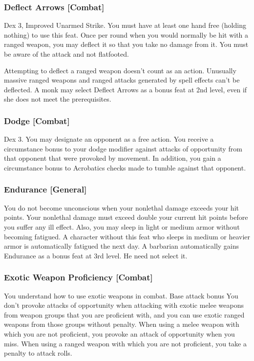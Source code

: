 \subsubsection{Deflect Arrows [Combat]}
 Dex 3, Improved Unarmed Strike.
 You must have at least one hand free (holding nothing) to use this feat. Once per round when you would normally be hit with a ranged weapon, you may deflect it so that you take no damage from it. You must be aware of the attack and not flatfooted.
\par Attempting to deflect a ranged weapon doesn't count as an action. Unusually massive ranged weapons and ranged attacks generated by spell effects can't be deflected.
 A monk may select Deflect Arrows as a bonus feat at 2nd level, even if she does not meet the prerequisites.

\subsubsection{Dodge [Combat]}
 Dex 3.
 You may designate an opponent as a free action. You receive a  circumstance bonus to your dodge modifier against attacks of opportunity from that opponent that were provoked by movement. In addition, you gain a  circumstance bonus to Acrobatics checks made to tumble against that opponent.

\subsubsection{Endurance [General]}
 You do not become unconscious when your nonlethal damage exceeds your hit points. Your nonlethal damage must exceed double your current hit points before you suffer any ill effect. Also, you may sleep in light or medium armor without becoming fatigued.
 A character without this feat who sleeps in medium or heavier armor is automatically fatigued the next day.
 A barbarian automatically gains Endurance as a bonus feat at 3rd level. He need not select it.

\subsubsection{Exotic Weapon Proficiency [Combat]}
You understand how to use exotic weapons in combat.
 Base attack bonus 
 You don't provoke attacks of opportunity when attacking with exotic melee weapons from weapon groups that you are proficient with, and you can use exotic ranged weapons from those groups without penalty.
 When using a melee weapon with which you are not proficient, you provoke an attack of opportunity when you miss. When using a ranged weapon with which you are not proficient, you take a  penalty to attack rolls.

